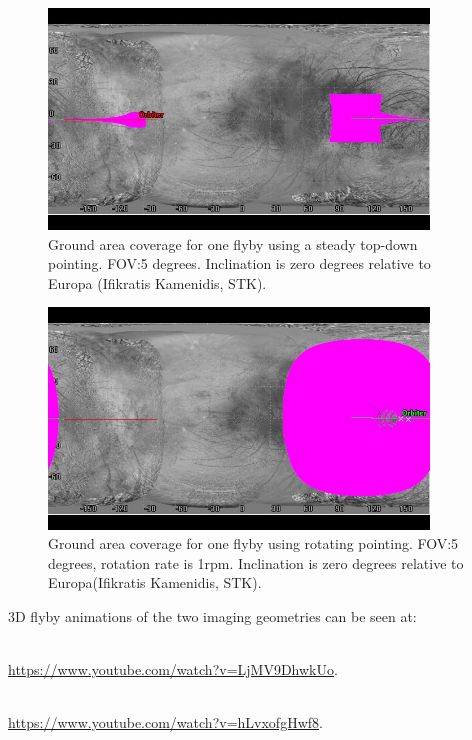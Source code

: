 \begin{figure}[htb!]
\centering
\includegraphics[width=0.9\textwidth]{figures/Orbiter/steady_cover.png}
\caption{Ground area coverage for one flyby using a steady top-down pointing. FOV:5 degrees. Inclination is zero degrees relative to Europa (Ifikratis Kamenidis, STK).}
\label{steadycov}
\end{figure}
\begin{figure}[htb!]
\centering
\includegraphics[width=0.9\textwidth]{figures/Orbiter/rot_cover.png}
\caption{Ground area coverage for one flyby using rotating pointing. FOV:5 degrees, rotation rate is 1rpm. Inclination is zero degrees relative to Europa(Ifikratis Kamenidis, STK).}
\label{rot_cover}
\end{figure}

\noindent
3D flyby animations of the two imaging geometries can be seen at:
\begin{description}[align=left]
\item [Steady top-down pointing:]\hfill \\
\url{https://www.youtube.com/watch?v=LjMV9DhwkUo}.
\item [Rotating pointing:]\hfill \\
\url{https://www.youtube.com/watch?v=hLvxofgHwf8}.
\end{description}


